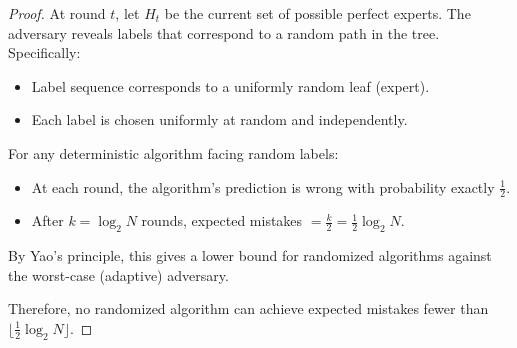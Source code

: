 \documentclass[letterpaper, 11pt]{article}
\newcommand{\1}{\mathds{1}}	%
\theoremstyle{definition}
\begin{document}
\begin{proof}
At round $t$, let $H_t$ be the current set of possible perfect experts. The adversary reveals labels that correspond to a random path in the tree. Specifically:
\begin{itemize}
    \item Label sequence corresponds to a uniformly random leaf (expert).
    \item Each label is chosen uniformly at random and independently.
\end{itemize}

For any deterministic algorithm facing random labels:
\begin{itemize}
    \item At each round, the algorithm's prediction is wrong with probability exactly $\frac{1}{2}$.
    \item After $k = \log_2 N$ rounds, expected mistakes $= \frac{k}{2} = \frac{1}{2}\log_2 N$.
\end{itemize}

By Yao's principle, this gives a lower bound for randomized algorithms against the worst-case (adaptive) adversary.

Therefore, no randomized algorithm can achieve expected mistakes fewer than $\lfloor \frac{1}{2}\log_2 N \rfloor$.
\end{proof}
\end{document}
